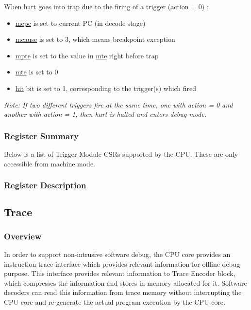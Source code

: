 \documentclass[main\_\_EN.tex]{subfiles}
\begin{document}
When hart goes into trap due to the firing of a trigger (\hyperref[fielddesc:MCONTROLACTION]{action} = 0) :
\begin{itemize}
    \item \hyperref[regdesc:MEPC]{mepc} is set to current PC (in decode stage)
    \item \hyperref[regdesc:MCAUSE]{mcause} is set to 3, which means breakpoint exception
    \item \hyperref[fielddesc:TCONTROLMPTE]{mpte} is set to the value in \hyperref[fielddesc:TCONTROLMTE]{mte} right before trap
    \item \hyperref[fielddesc:TCONTROLMTE]{mte} is set to 0
    \item \hyperref[fielddesc:MCONTROLHIT]{hit} bit is set to 1, corresponding to the trigger(s) which fired
\end{itemize}

\textit{Note: If two different triggers fire at the same time, one with action = 0 and another with action = 1, then hart is halted and enters debug mode.}


\hypertarget{riscvcpu-hwt-reg-summ}{}
\subsubsection{Register Summary}
\label{sec:riscvcpu-hwt-reg-summ}


Below is a list of Trigger Module CSRs supported by the CPU. These are only accessible from machine mode.




\subsubsection{Register Description}




\newpage
\subsection{Trace}
\label{sec:riscvcpu-trace}

\subsubsection{Overview}
\label{sec:riscvcpu-trace-overview}
In order to support non-intrusive software debug, the CPU core provides an instruction trace interface which provides relevant information for offline debug purpose. This interface provides relevant information to Trace Encoder block, which compresses the information and stores in memory allocated for it. Software decoders can read this information from trace memory without interrupting the CPU core and re-generate the actual program execution by the CPU core.
\end{document}
